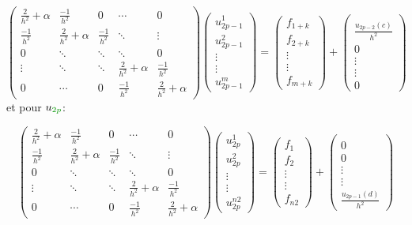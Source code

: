 \documentclass[a4paper,12pt,twoside]{report}
\begin{document}
\[
\begin{pmatrix}
   \frac{2}{h^{2}} +\alpha & \frac{-1}{h^{2}}  &0 &\cdots & 0 \\
   \frac{-1}{h^{2}}  & \frac{2}{h^{2}}  +\alpha & \frac{-1}{h^{2}} & \ddots &  \vdots \\ 0  & \ddots &  \ddots &  \ddots & 0\\   \vdots & \ddots & \ddots  & \frac{2}{h^{2}} +\alpha &  \frac{-1}{h^{2}}\\
 0 & \cdots & 0 & \frac{-1}{h^{2}} & \frac{2}{h^{2}} +\alpha
\end{pmatrix}
\begin{pmatrix}
  u_{2p-1}^{1} \\u_{2p-1}^{2}\\  \vdots\\ \vdots\\ u_{2p-1}^{m}
\end{pmatrix} = \begin{pmatrix}
  f_{1+k} \\ f_{2+k} \\ \vdots\\\vdots\\f_{m+k}
\end{pmatrix} +  \begin{pmatrix}\\\frac{u_{2p-2}(c)}{h^{2}}\\ 0 \\   \vdots\\
   \vdots\\
  0
\end{pmatrix} \]
et pour ${u_{\color[rgb]{0,0.58,0}2p}}$:

\[
\begin{pmatrix}
   \frac{2}{h^{2}} +\alpha & \frac{-1}{h^{2}}  &0 &\cdots & 0 \\
   \frac{-1}{h^{2}}  & \frac{2}{h^{2}}  +\alpha & \frac{-1}{h^{2}} & \ddots &  \vdots \\ 0  & \ddots &  \ddots &  \ddots & 0\\   \vdots & \ddots & \ddots  & \frac{2}{h^{2}} +\alpha &  \frac{-1}{h^{2}}\\
 0 & \cdots & 0 & \frac{-1}{h^{2}} & \frac{2}{h^{2}} +\alpha
\end{pmatrix}
\begin{pmatrix}
  u_{2p}^{1} \\u_{2p}^{2}\\  \vdots\\ \vdots\\ u_{2p}^{n2}
\end{pmatrix} = \begin{pmatrix}
  f_{1} \\ f_{2} \\ \vdots\\\vdots\\f_{n2}
\end{pmatrix} +  \begin{pmatrix}\\0\\ 0 \\   \vdots\\
   \vdots\\
  \frac{u_{2p-1}(d)}{h^{2}}
\end{pmatrix} \]
\end{document}
